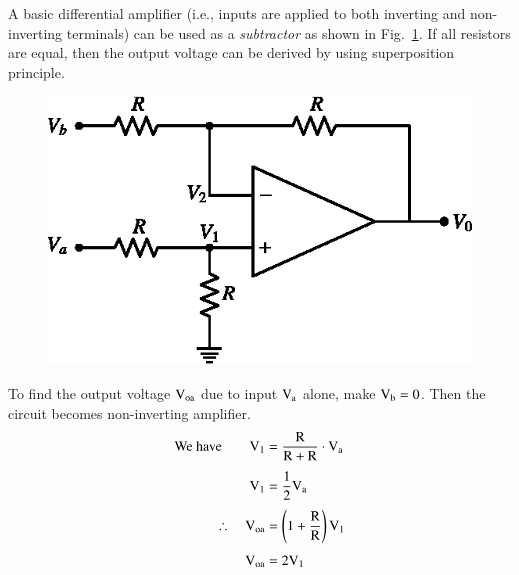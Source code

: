 

A basic differential amplifier (i.e., inputs are applied to both inverting and non-inverting terminals) can be used as a {\em subtractor} as shown in Fig.~\ref{fig4.12}. If all resistors are equal, then the output voltage can be derived by using superposition principle.
\begin{figure}[H]
\centering
\includegraphics[scale=.95]{chap4/fig4.12.eps}
\caption{}\label{fig4.12}
\end{figure}

To find the output voltage $\textrm{V}_{\textrm{o}\textrm{a}}$ due to input $\textrm{V}_{\textrm{a}}$ alone, make $\textrm{V}_{\textrm{b}}=0$. Then the circuit becomes non-inverting amplifier.
\begin{align}
\text{We have}\qquad \textrm{V}_{1} &= \frac{\textrm{R}}{\textrm{R}+\textrm{R}}\cdot \textrm{V}_{\textrm{a}}\notag\\[4pt]
\textrm{V}_{1} &= \frac{1}{2}\textrm{V}_{\textrm{a}}\label{eq4.38}\\[3pt]
\therefore\quad \textrm{V}_{\textrm{o}\textrm{a}} &= \left(1+\dfrac{\textrm{R}}{\textrm{R}}\right)\textrm{V}_{1}\notag\\[3pt]
\textrm{V}_{\textrm{o}\textrm{a}} &= 2\textrm{V}_{1}\label{eq4.39}
\end{align}

